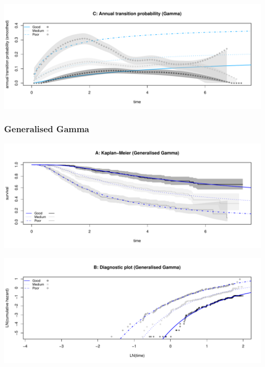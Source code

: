 \documentclass[
]{article}
\begin{document}
\begin{flushleft}\includegraphics[height=0.25\textheight]{BC_OS_output/Images/Figure_param_models-18} \end{flushleft}

\clearpage

\subsubsection{Generalised Gamma}\label{generalised-gamma}

\begin{flushleft}\includegraphics[height=0.25\textheight]{BC_OS_output/Images/Figure_param_models-19} \end{flushleft}

\begin{flushleft}\includegraphics[height=0.25\textheight]{BC_OS_output/Images/Figure_param_models-20} \end{flushleft}
\end{document}
